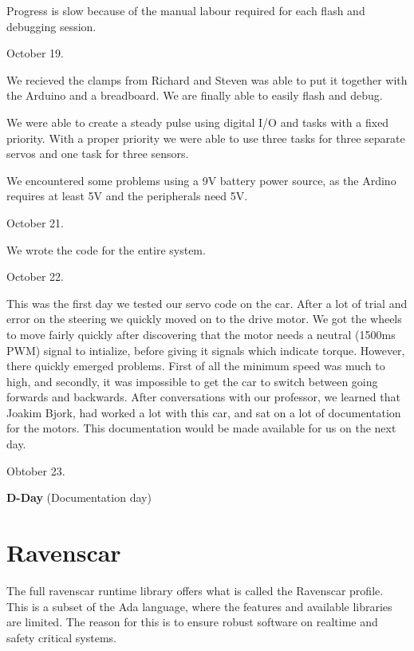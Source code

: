 \documentclass{article}
\begin{document}
Progress is slow because of the manual labour required for each flash and debugging session.
\vspace{5mm}

October 19. 

We recieved the clamps from Richard and Steven was able to put it together with the Arduino and a breadboard. We are finally able to easily flash and debug.

We were able to create a steady pulse using digital I/O and tasks with a fixed priority. With a proper priority we were able to use three tasks for three separate servos and one task for three sensors.

We encountered some problems using a 9V battery power source, as the Ardino requires at least 5V and the peripherals need 5V.


\vspace{5mm}
October 21.

We wrote the code for the entire system.


\vspace{5mm}
October 22.

This was the first day we tested our servo code on the car. After a lot of trial and error on the steering we quickly moved on to the drive motor. We got the wheels to move fairly quickly after discovering that the motor needs a neutral (1500ms PWM) signal to intialize, before giving it signals which indicate torque. However, there quickly emerged problems. First of all the minimum speed was much to high, and secondly, it was impossible to get the car to switch between going forwards and backwards. After conversations with our professor, we learned that Joakim Bjork, had worked a lot with this car, and sat on a lot of documentation for the motors. This documentation would be made available for us on the next day.

\vspace{5mm}

Obtober 23.

\textbf{D-Day} (Documentation day)

\section{Ravenscar}

The full ravenscar runtime library offers what is called the Ravenscar profile. This is a subset of the Ada language, where the features and available libraries are limited. The reason for this is to ensure robust software on realtime and safety critical systems. 
\end{document}
